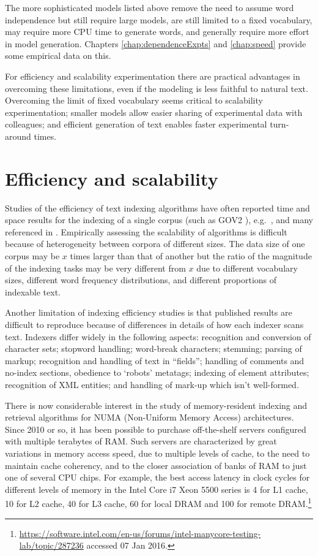 \documentclass[11pt]{report}
\begin{document}
The more sophisticated models listed above remove
the need to assume word independence but still require large models,
are still limited to a fixed vocabulary, may require more CPU time 
to generate words, 
and generally require more effort in model generation.  Chapters
\ref{chap:dependenceExpts} and \ref{chap:speed} provide some empirical
data on this.

For efficiency and scalability experimentation there are practical
advantages in overcoming these limitations, even if the modeling 
is less faithful to natural text.  Overcoming the limit of fixed 
vocabulary seems critical to scalability experimentation; smaller
models allow easier sharing of experimental data with colleagues;
and efficient generation of text enables faster experimental
turn-around times.    

\section{Efficiency and scalability}
 
Studies of the efficiency of text indexing algorithms
have often reported time and space results for the indexing of a single
corpus (such as GOV2 \cite{ClarkeCS2004}), e.g.~\cite{KonowNCL2013},
\cite{DingAS2010} and many referenced in \cite{ZobelMoffat2006}.
Empirically assessing the scalability of
algorithms is difficult because of heterogeneity between corpora of 
different sizes.  The data size of one corpus may be $x$ times larger than 
that of another but the ratio of the magnitude of the indexing
tasks may be very different from $x$ due to different vocabulary sizes, 
different word frequency distributions, and different proportions of
indexable text.

Another limitation of indexing efficiency studies is that published
results are difficult to reproduce because of differences in details
of how each indexer scans text.  Indexers differ widely in the
following aspects: recognition and conversion of character sets;
stopword handling; word-break characters; stemming; parsing of markup;
recognition and handling of text in ``fields''; handling of comments
and no-index sections, obedience to `robots' metatags; indexing of
element attributes; recognition of XML entities; and handling of mark-up
which isn't well-formed.



There is now considerable interest in the study of memory-resident
indexing and retrieval algorithms for NUMA (Non-Uniform Memory Access)
architectures.  Since 2010 or so, it has been possible to purchase
off-the-shelf servers configured with multiple terabytes of RAM. Such
servers are characterized by great variations in memory access speed,
due to multiple levels of cache, to the need to maintain cache
coherency, and to the closer association of banks of RAM to just one
of several CPU chips.  For example, the best access latency in clock
cycles for different levels of memory in the Intel Core i7 Xeon 5500
series is 4 for L1 cache, 10 for L2 cache, 40 for L3 cache, 60 for
local DRAM and 100 for remote
DRAM.\footnote{\url{https://software.intel.com/en-us/forums/intel-manycore-testing-lab/topic/287236}
  accessed 07 Jan 2016.}
\end{document}
